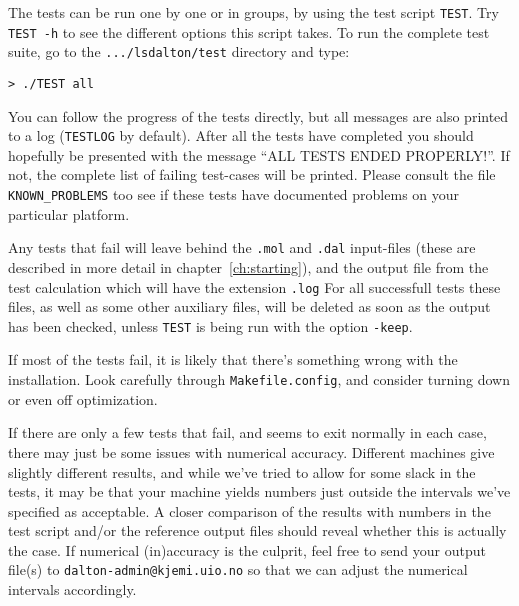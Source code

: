 The tests can be run one by one or in groups, by using the test script
\verb|TEST|. Try \verb|TEST -h| to see the different options this
script takes. 
To run the
complete test suite, go to the \verb|.../lsdalton/test| directory and
type:
\begin{verbatim}
> ./TEST all
\end{verbatim}
You can follow the progress of the tests directly, but all messages
are also printed to a log (\verb|TESTLOG| by default). After all the
tests have completed you should hopefully be presented with the
message ``ALL TESTS ENDED PROPERLY!''. If not, the complete list of 
failing test-cases
will be printed. Please consult the file
\verb|KNOWN_PROBLEMS| too see if these tests have documented problems
on your particular platform. 

Any tests that fail will leave behind the \verb|.mol| and \verb|.dal|
input-files (these are described in more detail in
chapter~\ref{ch:starting}), and the output file from the test
calculation which will have the extension \verb|.log| 
For all
successfull tests these files, as well as some other auxiliary files,
will be deleted as soon as the output has been checked, unless
\verb|TEST| is being run with the option \verb|-keep|.

If most of the tests fail, it is likely that there's something
wrong with the installation. Look carefully through
\verb|Makefile.config|, and consider turning down or even off
optimization.

If there are only a few tests that fail, and {\lsdalton} seems to exit
normally in each case, there may just be some issues with numerical
accuracy. Different machines give slightly different results, and
while we've tried to allow for some slack in the tests, it may be
that your machine yields numbers just outside the intervals we've
specified as acceptable. A closer comparison of the results with
numbers in the test script and/or the reference output files should
reveal whether this is actually the case. If numerical (in)accuracy is
the culprit, feel free to send your output file(s) to
\verb|dalton-admin@kjemi.uio.no| so that we can adjust the numerical
intervals accordingly.
